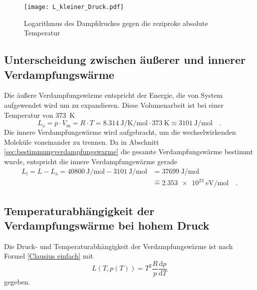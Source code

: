\begin{figure}[h!]
	\centering
	\texttt{[image: L\_kleiner\_Druck.pdf]}
	\caption{Logarithmus des Dampfdruckes gegen die reziproke absolute Temperatur}
	\label{fig:L_kleiner_Druck}
\end{figure}

\subsection{Unterscheidung zwischen äußerer und innerer Verdampfungswärme}
Die äußere Verdampfungswärme entspricht der Energie, die von System aufgewendet wird um zu expandieren. Diese Volumenarbeit ist bei einer Temperatur von  \SI{373}{\kelvin}
\begin{equation}
L_\text{a} = p \cdot V_\text{m} = R \cdot T = \SI{8.314}{\joule\per\kelvin\per\mol} \cdot  \SI{373}{\kelvin} \approx \SI{3101}{\joule\per\mol} \quad.
\end{equation}
Die innere Verdampfungswärme wird aufgebracht, um die wechselwirkenden Moleküle voneinander zu trennen. Da in Abschnitt \ref{sec:bestimmungverdampfungswarme} die gesamte Verdampfungswärme bestimmt wurde, entspricht die innere Verdampfungswärme gerade
\begin{align}
L_\text{i} = L - L_{\text{a}} = \SI{40800}{\joule\per\mol} - \SI{3101}{\joule\per\mol} &= \SI{37699}{\joule\per\mol} \\
&\widehat{=} \SI{2.353e23}{\eV\per\mol}\quad.
\end{align}





\subsection{Temperaturabhängigkeit der Verdampfungswärme bei hohem Druck}
Die Druck- und Temperaturabhängigkeit der Verdampfungswärme ist nach Formel \eqref{Clausius einfach} mit
\begin{equation}
	L(T, p(T)) = T^2\frac{R}{p}\frac{\text{d}p}{\text{d}T}
\end{equation} gegeben.

